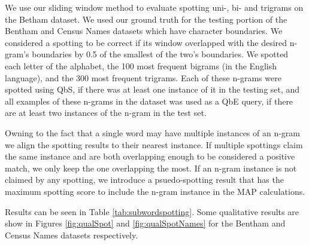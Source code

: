 \documentclass[ms,electronic,twosidetoc,letterpaper,chaptercenter,parttop,lol,lof,lot]{byumsphd}
\begin{document}
We use our sliding window method to evaluate spotting uni-, bi- and trigrams on the Betham dataset. We used our ground truth for the testing portion of the Bentham and Census Names datasets which have character boundaries. We considered a spotting to be correct if its window overlapped with the desired n-gram's boundaries by 0.5 of the smallest of the two's boundaries.
We spotted each letter of the alphabet, the 100 most frequent bigrams (in the English language), and the 300 most frequent trigrams. Each of these n-grams were spotted using QbS, if there was at least one instance of it in the testing set, and all examples of these n-grams in the dataset was used as a QbE query, if there are at least two instances of the n-gram in the test set.

Owning to the fact that a single word may have multiple instances of an n-gram we align the spotting results to their nearest instance. If multiple spottings claim the same instance and are both overlapping enough to be considered a positive match, we only keep the one overlapping the most.
If an n-gram instance is not claimed by any spotting, we introduce a psuedo-spotting result that has the maximum spotting score to include the n-gram instance in the MAP calculations.

Results can be seen in Table \ref{tab:subwordspotting}.
Some qualitative results are show in Figures \ref{fig:qualSpot} and \ref{fig:qualSpotNames} for the Bentham and Census Names datasets respectively.



\end{document}
